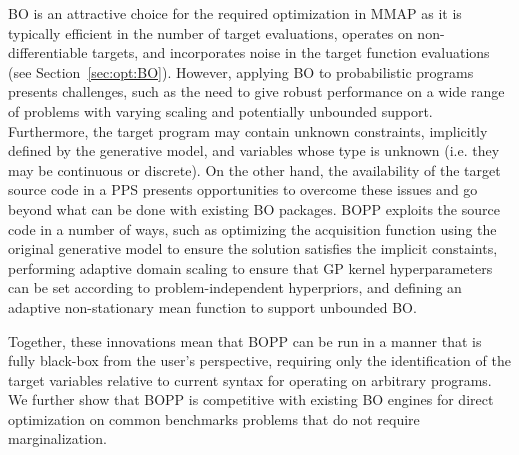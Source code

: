 BO is an attractive choice for the required optimization in MMAP as it is typically efficient in the number of target evaluations, operates on non-differentiable targets, and incorporates noise in the target function evaluations (see Section~\ref{sec:opt:BO}).  However, applying BO to probabilistic programs presents challenges, such as the need to give robust performance on a wide range of problems with varying scaling and potentially unbounded support.  Furthermore, the target program may contain unknown constraints, implicitly defined by the generative model, and variables whose type is unknown (i.e. they may be continuous or discrete).
On the other hand, the availability of the target source code in a PPS presents opportunities to overcome these issues and go beyond what can be done with existing BO packages.  BOPP exploits the source code in a number of ways, such as optimizing the acquisition function using the original generative model to ensure the solution satisfies the implicit constaints, performing adaptive domain scaling to ensure that GP kernel hyperparameters can be set according to problem-independent hyperpriors, and defining an adaptive non-stationary mean function to support unbounded BO. 

Together, these innovations mean that BOPP can be run in a manner that is fully black-box from the user's perspective, requiring only the identification of the target variables relative to current syntax for operating on arbitrary programs. We further show that BOPP is competitive with existing BO engines for direct optimization on common benchmarks problems that do not require marginalization.









